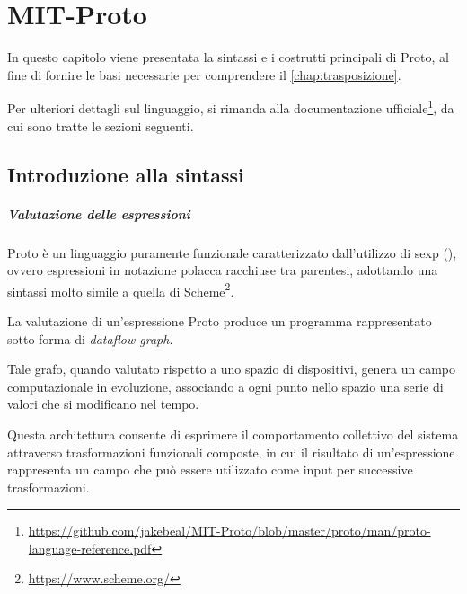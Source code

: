 \chapter{MIT-Proto}
\label{chap:mitproto}
In questo capitolo viene presentata la sintassi e i costrutti principali di Proto, al fine di fornire le basi necessarie per comprendere il \cref{chap:trasposizione}.
 
Per ulteriori dettagli sul linguaggio, si rimanda alla documentazione ufficiale\footnote{\url{https://github.com/jakebeal/MIT-Proto/blob/master/proto/man/proto-language-reference.pdf}}, da cui sono tratte le sezioni seguenti.

\section{Introduzione alla sintassi}
\label{sec:mitprotosyntax}


\paragraph{Valutazione delle espressioni}

Proto è un linguaggio puramente funzionale caratterizzato dall'utilizzo di \ac{sexp} (),  ovvero espressioni in notazione polacca racchiuse tra parentesi, adottando una sintassi molto simile a quella di Scheme\footnote{\url{https://www.scheme.org/}}.



La valutazione di un'espressione Proto produce un programma rappresentato sotto forma di \textit{dataflow graph}.

Tale grafo, quando valutato rispetto a uno spazio di dispositivi, genera un campo computazionale in evoluzione, associando a ogni punto nello spazio una serie di valori che si modificano nel tempo.

Questa architettura consente di esprimere il comportamento collettivo del sistema attraverso trasformazioni funzionali composte, in cui il risultato di un'espressione rappresenta un campo che può essere utilizzato come input per successive trasformazioni.

